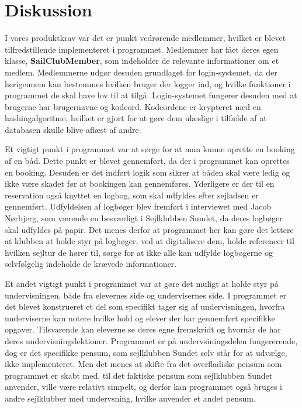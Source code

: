 \chapter{Diskussion}
I vores produktkrav var det er punkt vedrørende medlemmer, hvilket er blevet tilfredstillende implementeret i programmet. 
Medlemmer har fået deres egen klasse, \textbf{SailClubMember}, som indeholder de relevante informationer om et medlem. 
Medlemmerne udgør desuden grundlaget for login-systemet, da der herigennem kan bestemmes hvilken bruger der logger ind, og hvilke funktioner i programmet de skal have lov til at tilgå. 
Login-systemet fungerer desuden med at brugerne har brugernavne og kodeord. 
Kodeordene er krypteret med en hashingalgoritme, hvilket er gjort for at gøre dem ulæslige i tilfælde af at databasen skulle blive aflæst af andre. 

Et vigtigt punkt i programmet var at sørge for at man kunne oprette en booking af en båd. 
Dette punkt er blevet gennemført, da der i programmet kan oprettes en booking. 
Desuden er det indført logik som sikrer at båden skal være ledig og ikke være skadet før at bookingen kan gennemføres. 
Yderligere er der til en reservation også knyttet en logbog, som skal udfyldes efter sejladsen er gennemført. 
Udfyldelsen af logbøger blev fremført i interviewet med Jacob Nørbjerg, som værende en besværligt i Sejlklubben Sundet, da deres logbøger skal udfyldes på papir. 
Det menes derfor at programmet her kan gøre det lettere at klubben at holde styr på logbøger, ved at digitalisere dem, holde referencer til hvilken sejltur de hører til, sørge for at ikke alle kan udfylde logbøgerne og selvfølgelig indeholde de krævede informationer. 

Et andet vigtigt punkt i programmet var at gøre det muligt at holde styr på undervisningen, både fra elevernes side og undervisernes side. 
I programmet er det blevet konstrueret et del som specifikt tager sig af undervisningen, hvorfra underviserne kan notere hvilke hold og elever der har gennemført specifikke opgaver.
Tilsvarende kan eleverne se deres egne fremskridt og hvornår de har deres undervisningslektioner.
Programmet er på undervsiningsdelen fungererende, dog er det specifikke pensum, som sejlklubben Sundet selv står for at udvælge, ikke implementeret. 
Men det menes at skifte fra det overfladiske pensum som programmet er skabt med, til det faktiske pensum som sejlklubben Sundet anvender, ville være relativt simpelt, og derfor kan programmet også bruges i andre sejlklubber med undervsning, hvilke anvender et andet pensum.


